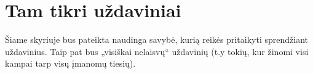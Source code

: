 \newpage
\section{Tam tikri uždaviniai}

Šiame skyriuje bus pateikta naudinga savybė, kurią reikės
pritaikyti sprendžiant uždavinius. Taip pat bus „visiškai
nelaisvų“ uždavinių (t.y tokių, kur žinomi visi kampai tarp
visų įmanomų tiesių).


%
%
%

